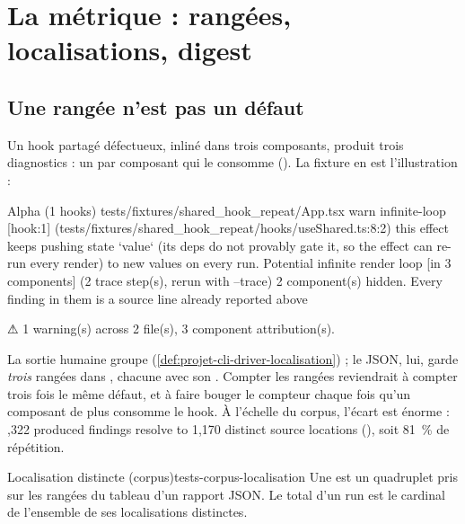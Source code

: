 \section{La métrique : rangées, localisations, digest}
\label{sec:tests-corpus-metrique}

\subsection{Une rangée n'est pas un défaut}

Un hook partagé défectueux, inliné dans trois composants, produit trois diagnostics : un par composant qui le consomme (). La fixture  en est l'illustration :

\begin{sortie}
  Alpha  (1 hooks)  tests/fixtures/shared_hook_repeat/App.tsx
    warn   infinite-loop  [hook:1]  (tests/fixtures/shared_hook_repeat/hooks/useShared.ts:8:2)  this effect keeps pushing state `value` (its deps do not provably gate it, so the effect can re-run every render) to new values on every run. Potential infinite render loop  [in 3 components]
       (2 trace step(s), rerun with --trace)
   2 component(s) hidden. Every finding in them is a source line already reported above

⚠  1 warning(s) across 2 file(s), 3 component attribution(s).
\end{sortie}

La sortie humaine groupe (\cref{def:projet-cli-driver-localisation}) ; le JSON, lui, garde \emph{trois} rangées dans , chacune avec son . Compter les rangées reviendrait à compter trois fois le même défaut, et à faire bouger le compteur chaque fois qu'un composant de plus consomme le hook. À l'échelle du corpus, l'écart est énorme : ,322 produced findings resolve to 1,170 distinct source locations\fg{} (), soit 81~\% de répétition.

\begin{definition}{Localisation distincte (corpus)}{tests-corpus-localisation}
Une  est un quadruplet  pris sur les rangées du tableau  d'un rapport JSON. Le total d'un run est le cardinal de l'ensemble de ses localisations distinctes.
\end{definition}

